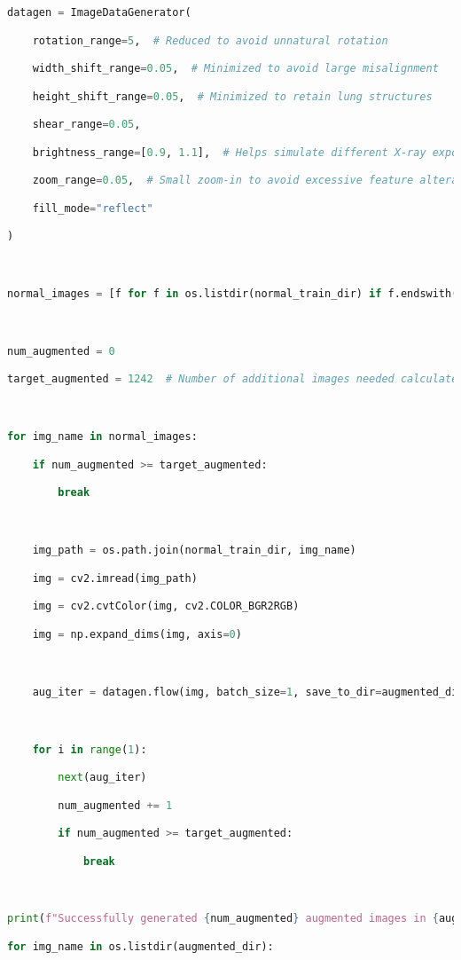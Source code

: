 \documentclass{article}
\begin{document}
\begin{lstlisting}[style=mystyle,language=Python]
datagen = ImageDataGenerator(

    rotation_range=5,  # Reduced to avoid unnatural rotation

    width_shift_range=0.05,  # Minimized to avoid large misalignment

    height_shift_range=0.05,  # Minimized to retain lung structures

    shear_range=0.05,

    brightness_range=[0.9, 1.1],  # Helps simulate different X-ray exposures

    zoom_range=0.05,  # Small zoom-in to avoid excessive feature alteration

    fill_mode="reflect"

)



normal_images = [f for f in os.listdir(normal_train_dir) if f.endswith(".jpeg")]



num_augmented = 0

target_augmented = 1242  # Number of additional images needed calculated by 3875/1.5 = 2583 => 2583-1341 = 1242



for img_name in normal_images:

    if num_augmented >= target_augmented:

        break



    img_path = os.path.join(normal_train_dir, img_name)

    img = cv2.imread(img_path)

    img = cv2.cvtColor(img, cv2.COLOR_BGR2RGB)

    img = np.expand_dims(img, axis=0)



    aug_iter = datagen.flow(img, batch_size=1, save_to_dir=augmented_dir, save_prefix="aug", save_format="jpeg")



    for i in range(1):

        next(aug_iter)

        num_augmented += 1

        if num_augmented >= target_augmented:

            break



print(f"Successfully generated {num_augmented} augmented images in {augmented_dir}!")

for img_name in os.listdir(augmented_dir):


\end{lstlisting}
\end{document}
